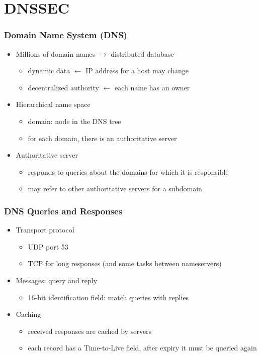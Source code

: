 \documentclass[final]{article}
\begin{document}
\section{DNSSEC}
\subsubsection*{Domain Name System (DNS)}
\begin{itemize}[nosep]
    \item Millions of domain names $\rightarrow$ distributed database
          \begin{itemize}[nosep]
              \item dynamic data $\leftarrow$ IP address for a host may change
              \item decentralized authority $\leftarrow$ each name has an owner
          \end{itemize}
    \item Hierarchical name space
          \begin{itemize}[nosep]
              \item domain: node in the DNS tree
              \item for each domain, there is an authoritative server
          \end{itemize}
    \item Authoritative server
          \begin{itemize}[nosep]
              \item responds to queries about the domains for which it is responsible
              \item may refer to other authoritative servers for a subdomain
          \end{itemize}
\end{itemize}
\subsubsection*{DNS Queries and Responses}
\begin{itemize}[nosep]
    \item Transport protocol
          \begin{itemize}[nosep]
              \item UDP port 53
              \item TCP for long responses (and some tasks between nameservers)
          \end{itemize}
    \item Messages: query and reply
          \begin{itemize}[nosep]
              \item 16-bit identification field: match queries with replies
          \end{itemize}
    \item Caching
          \begin{itemize}[nosep]
              \item received responses are cached by servers
              \item each record has a Time-to-Live field, after expiry it must be queried again
          \end{itemize}
\end{itemize}
\end{document}
